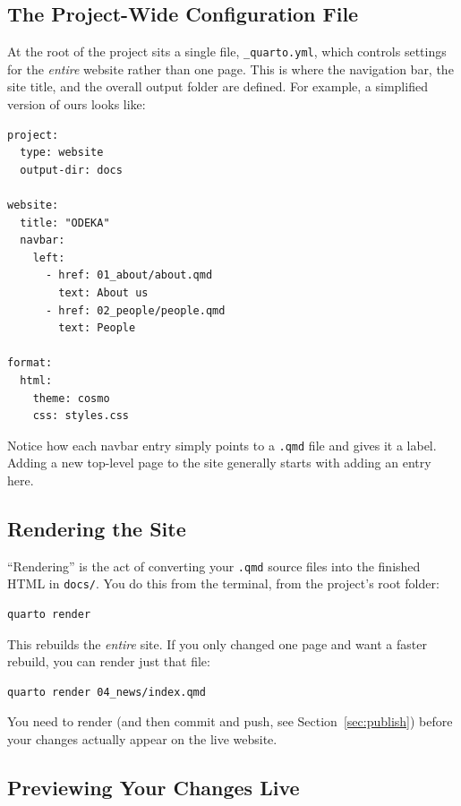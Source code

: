 \documentclass[11pt]{article}
\newcommand{\file}[1]{\texttt{#1}}
\begin{document}
\subsection{The Project-Wide Configuration File}

At the root of the project sits a single file, \file{\_quarto.yml}, which
controls settings for the \emph{entire} website rather than one page. This
is where the navigation bar, the site title, and the overall output
folder are defined. For example, a simplified version of ours looks like:

\begin{lstlisting}
project:
  type: website
  output-dir: docs

website:
  title: "ODEKA"
  navbar:
    left:
      - href: 01_about/about.qmd
        text: About us
      - href: 02_people/people.qmd
        text: People

format:
  html:
    theme: cosmo
    css: styles.css
\end{lstlisting}

Notice how each navbar entry simply points to a \file{.qmd} file and gives
it a label. Adding a new top-level page to the site generally starts with
adding an entry here.

\subsection{Rendering the Site}

``Rendering'' is the act of converting your \file{.qmd} source files into
the finished HTML in \file{docs/}. You do this from the terminal, from
the project's root folder:

\begin{lstlisting}
quarto render
\end{lstlisting}

This rebuilds the \emph{entire} site. If you only changed one page and
want a faster rebuild, you can render just that file:

\begin{lstlisting}
quarto render 04_news/index.qmd
\end{lstlisting}

You need to render (and then commit and push, see Section~\ref{sec:publish})
before your changes actually appear on the live website.

\subsection{Previewing Your Changes Live}
\end{document}
